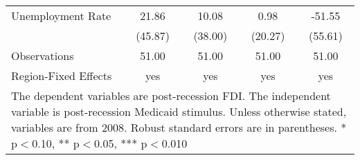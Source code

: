 \begin{table}[!htbp]
\begin{tabular}{l*{4}{c}}
Unemployment Rate   &       21.86   &       10.08   &        0.98   &      -51.55   \\
                    &     (45.87)   &     (38.00)   &     (20.27)   &     (55.61)   \\
\hline
Observations        &       51.00   &       51.00   &       51.00   &       51.00   \\
Region-Fixed Effects&         yes   &         yes   &         yes   &         yes   \\
\hline\hline
\multicolumn{5}{p{\linewidth}}{\footnotesize The dependent variables are post-recession FDI. The independent variable is post-recession Medicaid stimulus. Unless otherwise stated, variables are from 2008. Robust standard errors are in parentheses. * p$<$0.10, ** p$<$0.05, *** p$<$0.010}\\
\end{tabular}
\end{table}
